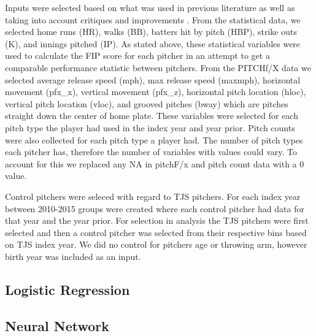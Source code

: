 Inputs were selected based on what was used in previous literature as well as taking into account critiques and improvements \cite{Gray2014}. From the statistical data, we selected home runs (HR), walks (BB), batters hit by pitch (HBP), strike outs (K), and innings pitched (IP). As stated above, these statistical variables were used to calculate the FIP score for each pitcher in an attempt to get a comparable performance statistic between pitchers. From the PITCHf/X data we selected average release speed (mph), max release speed (maxmph), horizontal movement (pfx\_x), vertical movement (pfx\_z), horizontal pitch location (hloc), vertical pitch location (vloc), and grooved pitches (bway) which are pitches straight down the center of home plate. These variables were selected for each pitch type the player had used in the index year and year prior. Pitch counts were also collected for each pitch type a player had. The number of pitch types each pitcher has, therefore the number of variables with values could vary. To account for this we replaced any NA in pitchF/x and pitch count data with a 0 value.

Control pitchers were seleced with regard to TJS pitchers. For each index year between 2010-2015 groups were created where each control pitcher had data for that year and the year prior. For selection in analysis the TJS pitchers were first selected and then a control pitcher was selected from their respective bins based on TJS index year. We did no control for pitchers age or throwing arm, however birth year was included as an input.

\subsection{Logistic Regression}

\subsection{Neural Network}